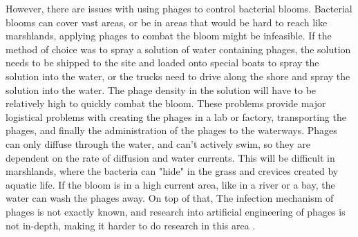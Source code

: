 However, there are issues with using phages to control bacterial blooms. Bacterial blooms can cover vast areas, or be in areas that would be hard to reach like marshlands, applying phages to combat the bloom might be infeasible. If the method of choice was to spray a solution of water containing phages, the solution needs to be shipped to the site and loaded onto special boats to  spray the solution into the water, or the trucks need to drive along the shore and spray the solution into the water. The phage density in the solution will have to be relatively high to quickly combat the bloom. These problems provide major logistical problems with creating the phages in a lab or factory, transporting the phages, and finally the administration of the phages to the waterways. Phages can only diffuse through the water, and can't actively swim, so they are dependent on the rate of diffusion and water currents. This will be difficult in marshlands, where the bacteria can "hide" in the grass and crevices created by aquatic life. If the bloom is in a high current area, like in a river or a bay, the water can wash the phages away. On top of that, The infection mechanism of phages is not exactly known, and research into artificial engineering of phages is not in-depth, making it harder to do research in this area \cite{grassoReviewCyanophageHost2022, DissolvedMicrocystinRelease}. 